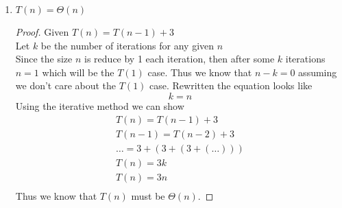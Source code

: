 \documentclass[paper=a4, fontsize=11pt]{scrartcl} %
\numberwithin{equation}{section} %
\numberwithin{figure}{section} %
\numberwithin{table}{section} %
\begin{document}
\begin{enumerate}
\begin{enumerate}
\begin{proof}
\begin{align*}
                \frac{ 2 }{ 2 }\right)  \tag{eq. 0.1}\\
                &= \frac{ n^2 - n }{ 2 } - 
                \left(\frac{ n - 1 }{ 2 }\right)\left(
                \frac{ n + 1 }{ 2 }\right) \\
                &= \frac{ n^2 - n }{ 2 } - \frac{ n^2 - 1 }{ 4 } \\
                &= \frac{ 2n^2 - 2n }{ 4 } - \frac{ n^2 - 1 }{ 4 } \\
                T(n) &= \frac{ n^2 - 2n + 1 }{ 4 } \\
            \end{align*}
            Thus we can see that $T(n)$ must be $\Theta(n^2)$.
        \end{proof}

    \item $T(n) = \Theta(n)$
    \begin{proof}
        Given $T(n) = T(n - 1) + 3$ \\
        Let $k$ be the number of iterations for any given $n$ \\
        Since the size $n$ is reduce by 1 each iteration, then after some 
        $k$ iterations $n = 1$ which will be the $T(1)$ case. Thus we know
        that $n - k = 0$ assuming we don't care about the $T(1)$ case. 
        Rewritten the equation looks like 
        \begin{equation}
            k = n
        \end{equation}
        Using the iterative method we can show
        \begin{align*}
            T(n) = T(n - 1) + 3 \\
            T(n - 1) = T(n - 2) + 3 \\
            \ldots = 3 + (3 + (3 + (\ldots))) \\
            T(n) = 3k \\
            T(n) = 3n \tag{eq 0.3} \\
        \end{align*}
        Thus we know that $T(n)$ must be $\Theta(n)$.
    \end{proof}


\end{enumerate}
\end{enumerate}
\end{document}
